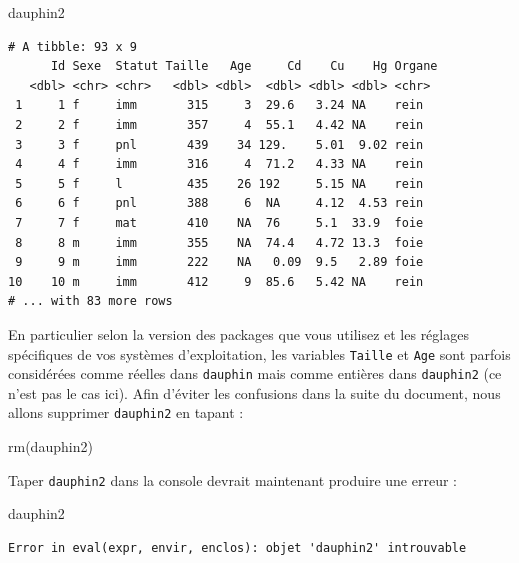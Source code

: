 \documentclass[
  letterpaper,
  DIV=11,
  numbers=noendperiod]{scrreprt}
\newenvironment{Shaded}{\begin{snugshade}}{\end{snugshade}}
\newcommand{\FunctionTok}[1]{\textcolor[rgb]{0.28,0.35,0.67}{#1}}
\newcommand{\NormalTok}[1]{\textcolor[rgb]{0.00,0.23,0.31}{#1}}
\begin{document}
\begin{Shaded}
\begin{Highlighting}[]
\NormalTok{dauphin2}
\end{Highlighting}
\end{Shaded}

\begin{verbatim}
# A tibble: 93 x 9
      Id Sexe  Statut Taille   Age     Cd    Cu    Hg Organe
   <dbl> <chr> <chr>   <dbl> <dbl>  <dbl> <dbl> <dbl> <chr> 
 1     1 f     imm       315     3  29.6   3.24 NA    rein  
 2     2 f     imm       357     4  55.1   4.42 NA    rein  
 3     3 f     pnl       439    34 129.    5.01  9.02 rein  
 4     4 f     imm       316     4  71.2   4.33 NA    rein  
 5     5 f     l         435    26 192     5.15 NA    rein  
 6     6 f     pnl       388     6  NA     4.12  4.53 rein  
 7     7 f     mat       410    NA  76     5.1  33.9  foie  
 8     8 m     imm       355    NA  74.4   4.72 13.3  foie  
 9     9 m     imm       222    NA   0.09  9.5   2.89 foie  
10    10 m     imm       412     9  85.6   5.42 NA    rein  
# ... with 83 more rows
\end{verbatim}

En particulier selon la version des packages que vous utilisez et les
réglages spécifiques de vos systèmes d'exploitation, les variables
\texttt{Taille} et \texttt{Age} sont parfois considérées comme réelles
dans \texttt{dauphin} mais comme entières dans \texttt{dauphin2} (ce
n'est pas le cas ici). Afin d'éviter les confusions dans la suite du
document, nous allons supprimer \texttt{dauphin2} en tapant :

\begin{Shaded}
\begin{Highlighting}[]
\FunctionTok{rm}\NormalTok{(dauphin2)}
\end{Highlighting}
\end{Shaded}

Taper \texttt{dauphin2} dans la console devrait maintenant produire une
erreur :

\begin{Shaded}
\begin{Highlighting}[]
\NormalTok{dauphin2}
\end{Highlighting}
\end{Shaded}

\begin{verbatim}
Error in eval(expr, envir, enclos): objet 'dauphin2' introuvable
\end{verbatim}
\end{document}
